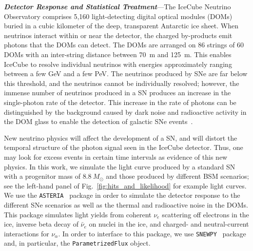 
\textbf{\textit{Detector Response and Statistical Treatment}}---The IceCube Neutrino Observatory comprises 5,160 light-detecting digital optical modules (DOMs) buried in a cubic kilometer of the deep, transparent Antarctic ice sheet.
When neutrinos interact within or near the detector, the charged by-products emit photons that the DOMs can detect.
The DOMs are arranged on 86 strings of 60 DOMs with an inter-string distance between 70~m and 125~m.
This enables IceCube to resolve individual neutrinos with energies approximately ranging between a few GeV and a few PeV.
The neutrinos produced by SNe are far below this threshold, and the neutrinos cannot be individually resolved; however, the immense number of neutrinos produced in a SN produces an increase in the single-photon rate of the detector.
This increase in the rate of photons can be distinguished by the background caused by dark noise and radioactive activity in the DOM glass to enable the detection of galactic SNe events~\cite{Griswold:2023iwz}.

New neutrino physics will affect the development of a SN, and will distort the temporal structure of the photon signal seen in the IceCube detector.
Thus, one may look for excess events in certain time intervals as evidence of this new physics.
In this work, we simulate the light curve produced by a standard SN with a progenitor mass of $8.8~M_{\odot}$ and those produced by different BSM scenarios; see the left-hand panel of Fig.~\ref{fig:hits_and_likelihood} for example light curves.
We use the \texttt{ASTERIA}~\cite{spencer_griswold_2020_3926835} package in order to simulate the detector response to the different SNe scenarios as well as the thermal and radioactive noise in the DOMs. 
This package simulates light yields from coherent $\nu_{e}$ scattering off electrons in the ice, inverse beta decay of $\bar{\nu}_{e}$ on nuclei in the ice, and charged- and neutral-current interactions for $\nu_{\alpha}$.
In order to interface to this package, we use \texttt{SNEWPY}~\cite{baxter2021snewpy} package and, in particular, the \texttt{ParametrizedFlux} object.

